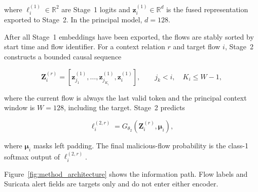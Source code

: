 \documentclass[11pt,fleqn]{report}
\begin{document}
where $\boldsymbol{\ell}^{(1)}_i\in\mathbb{R}^{2}$ are Stage~1 logits and $\mathbf{z}^{(1)}_i\in\mathbb{R}^{d}$ is the fused representation exported to Stage~2. In the principal model, $d=128$.

After all Stage~1 embeddings have been exported, the flows are stably sorted by start time and flow identifier. For a context relation $r$ and target flow $i$, Stage~2 constructs a bounded causal sequence

\begin{equation}
    \mathbf{Z}^{(r)}_i=
    \left[
        \mathbf{z}^{(1)}_{j_1},\ldots,
        \mathbf{z}^{(1)}_{j_{K_i}},
        \mathbf{z}^{(1)}_i
    \right],
    \qquad j_k<i,\quad K_i\leq W-1,
    \label{eq:method_stage2_input}
\end{equation}

where the current flow is always the last valid token and the principal context window is $W=128$, including the target. Stage~2 predicts

\begin{equation}
    \boldsymbol{\ell}^{(2,r)}_i
    =G_{\theta_2}
    \left(\mathbf{Z}^{(r)}_i,\boldsymbol{\mu}_i\right),
    \label{eq:method_stage2_mapping}
\end{equation}

where $\boldsymbol{\mu}_i$ masks left padding. The final malicious-flow probability is the class-1 softmax output of $\boldsymbol{\ell}^{(2,r)}_i$.

Figure~\ref{fig:method_architecture} shows the information path. Flow labels and Suricata alert fields are targets only and do not enter either encoder.
\end{document}
